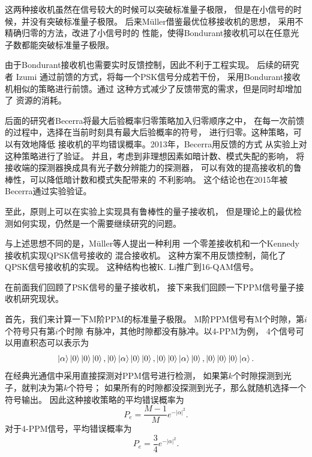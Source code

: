 这两种接收机虽然在信号较大的时候可以突破标准量子极限，
但是在小信号的时候，并没有突破标准量子极限。
后来M{\"u}ller借鉴最优位移接收机的思想，
采用不精确归零的方法，改进了小信号时的
性能，使得Bondurant接收机可以在任意光子数都能突破标准量子极限\cite{muller2014qpsk,muller2014m}。

由于Bondurant接收机也需要实时反馈控制，因此不利于工程实现。
后续的研究者 Izumi 通过前馈的方式，将每一个PSK信号分成若干份，
采用Bondurant接收机相似的策略进行前馈\cite{izumi2012displacement}。通过
这种方式减少了反馈带宽的需求，但是同时却增加了
资源的消耗。

后面的研究者Becerra将最大后验概率归零策略加入归零顺序之中，
在每一次前馈的过程中，选择在当前时刻具有最大后验概率的符号，
进行归零\cite{becerra2011m}。这种策略，可以有效地降低
接收机的平均错误概率。2013年，Becerra用反馈的方式
从实验上对这种策略进行了验证\cite{becerra2013experimental}。
并且，考虑到非理想因素如暗计数、模式失配的影响，
将接收端的探测器换成具有光子数分辨能力的探测器，
可以有效的提高接收机的鲁棒性，可以降低暗计数和模式失配带来的
不利影响\cite{izumi2013quantum,li2013suppressing}。
这个结论也在2015年被Becerra通过实验验证\cite{becerra2015photon}。

至此，原则上可以在实验上实现具有鲁棒性的量子接收机，
但是理论上的最优检测如何实现，仍然是一个需要继续研究的问题。

与上述思想不同的是，M{\"u}ller等人提出一种利用
一个零差接收机和一个Kennedy接收机实现QPSK信号接收的
混合接收机\cite{muller2012quadrature}。
这种方案不用反馈控制，简化了QPSK信号接收机的实现。
这种结构也被K. Li推广到16-QAM信号\cite{李科2014}。

在前面我们回顾了PSK信号的量子接收机，
接下来我们回顾一下PPM信号量子接收机研究现状。

首先，我们来计算一下M阶PPM的标准量子极限。
M阶PPM信号有M个时隙，第$i$个符号只有第$i$个时隙
有脉冲，其他时隙都没有脉冲。以4-PPM为例，
4个信号可以用直积态可以表示为
\begin{equation}
\ket{\alpha}\ket{0}\ket{0}\ket{0}, \ket{0}\ket{\alpha}\ket{0}\ket{0},\ket{0}\ket{0}\ket{\alpha}\ket{0}, \ket{0}\ket{0}\ket{0}\ket{\alpha}.
\end{equation}
在经典光通信中采用直接探测对PPM信号进行检测，
如果第$k$个时隙探测到光子，就判决为第$k$个符号；
如果所有的时隙都没探测到光子，那么就随机选择一个符号输出。
因此这种接收策略的平均错误概率为
\begin{equation}
P_e = \frac{M-1}{M} e^{-|\alpha|^2}.
\end{equation}
对于4-PPM信号，平均错误概率为
\begin{equation}
P_e = \frac{3}{4} e^{-|\alpha|^2}.
\end{equation}

